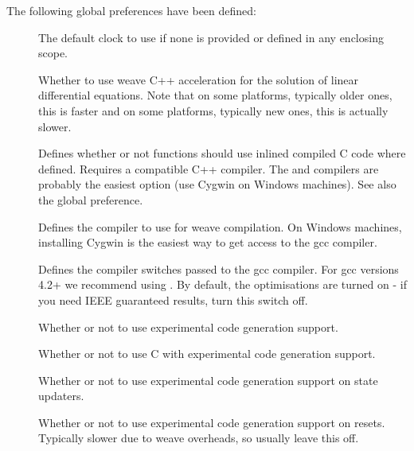 \documentclass[letterpaper,10pt,english]{manual}
\begin{document}
The following global preferences have been defined:
\begin{description}
\item[] \leavevmode
The default clock to use if none is provided or defined
in any enclosing scope.

\item[] \leavevmode
Whether to use weave C++ acceleration for the solution
of linear differential equations. Note that on some
platforms, typically older ones, this is faster and on
some platforms, typically new ones, this is actually
slower.

\item[] \leavevmode
Defines whether or not functions should use inlined compiled
C code where defined. Requires a compatible C++ compiler.
The  and  compilers are probably the easiest
option (use Cygwin on Windows machines). See also the
 global preference.

\item[] \leavevmode
Defines the compiler to use for weave compilation. On Windows machines, installing
Cygwin is the easiest way to get access to the gcc compiler.

\item[] \leavevmode
Defines the compiler switches passed to the gcc compiler. For gcc versions
4.2+ we recommend using . By default, the 
optimisations are turned on - if you need IEEE guaranteed results, turn
this switch off.

\item[] \leavevmode
Whether or not to use experimental code generation support.

\item[] \leavevmode
Whether or not to use C with experimental code generation support.

\item[] \leavevmode
Whether or not to use experimental code generation support on state updaters.

\item[] \leavevmode
Whether or not to use experimental code generation support on resets.
Typically slower due to weave overheads, so usually leave this off.


\end{description}
\end{document}
